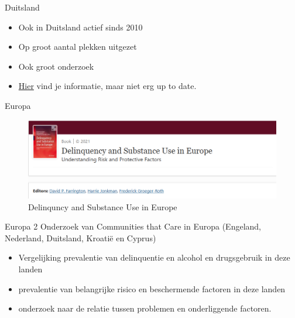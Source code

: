 \documentclass[
  ignorenonframetext,
]{beamer}
\providecommand{\tightlist}{%
  \setlength{\itemsep}{0pt}\setlength{\parskip}{0pt}}\usepackage{longtable,booktabs,array}
\begin{document}
\begin{frame}{Duitsland}
\protect\hypertarget{duitsland}{}
\begin{itemize}
\tightlist
\item
  Ook in Duitsland actief sinds 2010\\
\item
  Op groot aantal plekken uitgezet
\item
  Ook groot onderzoek\\
\item
  \href{https://www.ctc-info.de/nano.cms/umsetzung}{Hier} vind je
  informatie, maar niet erg up to date.
\end{itemize}
\end{frame}

\begin{frame}{Europa}
\protect\hypertarget{europa}{}
\begin{figure}

{\centering \includegraphics{images/Springer.png}

}

\caption{Delinquncy and Substance Use in Europe}

\end{figure}
\end{frame}

\begin{frame}{Europa 2}
\protect\hypertarget{europa-2}{}
Onderzoek van Communities that Care in Europa (Engeland, Nederland,
Duitsland, Kroatië en Cyprus)

\begin{itemize}
\tightlist
\item
  Vergelijking prevalentie van delinquentie en alcohol en drugsgebruik
  in deze landen\\
\item
  prevalentie van belangrijke risico en beschermende factoren in deze
  landen\\
\item
  onderzoek naar de relatie tussen problemen en onderliggende factoren.
\end{itemize}
\end{frame}
\end{document}
